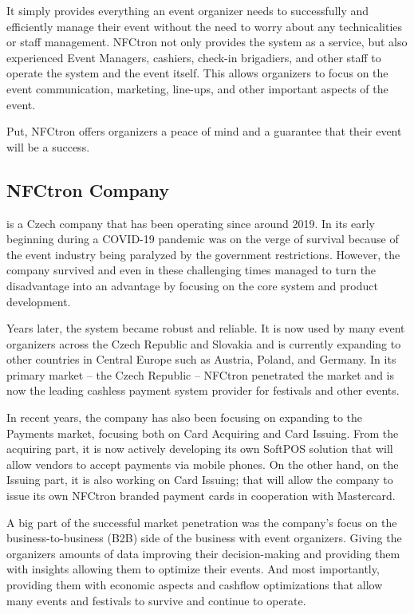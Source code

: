 It simply provides everything an event organizer needs to successfully and efficiently manage their event without the need to worry about any technicalities or staff management.
NFCtron not only provides the system as a service, but also experienced Event Managers, cashiers, check-in brigadiers, and other staff to operate the system and the event itself.
This allows organizers to focus on the event communication, marketing, line-ups, and other important aspects of the event.

Put, NFCtron offers organizers a peace of mind and a guarantee that their event will be a success.

\subsection*{NFCtron Company}
\label{subsec:introduction-background-motivation-nfctron}
is a Czech company that has been operating since around 2019.
In its early beginning during a COVID-19 pandemic was on the verge of survival because of the event industry being paralyzed by the government restrictions.
However, the company survived and even in these challenging times managed to turn the disadvantage into an advantage by focusing on the core system and product development\cite{nfctron_en_about_us}.

Years later, the system became robust and reliable.
It is now used by many event organizers across the Czech Republic and Slovakia and is currently expanding to other countries in Central Europe such as Austria\cite{nfctron_blog_nfctron_austria_events_festivals_september_visitors_payments}, Poland, and Germany.
In its primary market – the Czech Republic – NFCtron penetrated the market and is now the leading cashless payment system provider for festivals and other events.

In recent years, the company has also been focusing on expanding to the Payments market, focusing both on Card Acquiring and Card Issuing.
From the acquiring part, it is now actively developing its own SoftPOS solution that will allow vendors to accept payments via mobile phones.
On the other hand, on the Issuing part, it is also working on Card Issuing; that will allow the company to issue its own NFCtron branded payment cards in cooperation with Mastercard\cite{nfctron_blog_nfctron_keynote_mastercard_cashless_event}.

A big part of the successful market penetration was the company's focus on the business-to-business (B2B) side of the business with event organizers.
Giving the organizers amounts of data improving their decision-making and providing them with insights allowing them to optimize their events.
And most importantly, providing them with economic aspects and cashflow optimizations that allow many events and festivals to survive and continue to operate.

